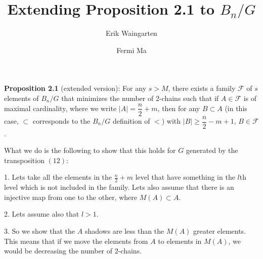 \documentclass[11pt]{amsart}
\author{Erik Waingarten \and Fermi Ma}
\title{Extending Proposition 2.1 to $B_n/G$}
\theoremstyle{definition}
\theoremstyle{remark}
\newcommand{\F}{\mathcal{F}}
\begin{document}
         
\maketitle

\textbf{Proposition 2.1} (extended version): For any $s > M$, there exists a family $\F$ of $s$ elements of $B_n/G$ that minimizes the number of 2-chains such that if $A \in \F$ is of maximal cardinality, where we write $|A| = \dfrac{n}{2} + m$, then for any $B \subset A$ (in this case, $\subset$ corresponds to the $B_n/G$ definition of $<$) with $|B| \geq \dfrac{n}{2} - m + 1$, $B \in \F$.

What we do is the following to show that this holds for $G$ generated by the transposition $(12)$:

1. Lets take all the elements in the $\frac{n}{2} + m$ level that have something in the $l$th level which is not included in the family. Lets also assume that there is an injective map from one to the other, where $M(A) \subset A$. 

2. Lets assume also that $l > 1$. 

3. So we show that the $A$ shadows are less than the $M(A)$ greater elements. This means that if we move the elements from $A$ to elements in $M(A)$, we would be decreasing the number of 2-chains. 
\end{document}
